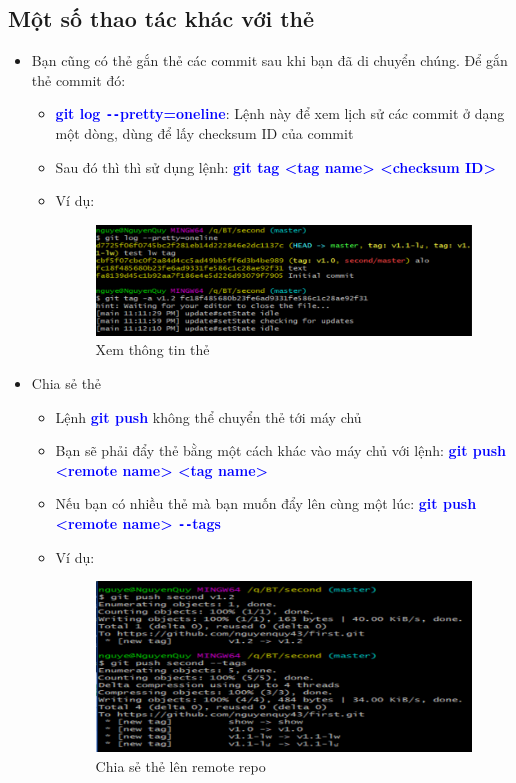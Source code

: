 \documentclass[12pt,a4paper]{report}
\begin{document}
\subsection{Một số thao tác khác với thẻ}
\begin{itemize}
\item Bạn cũng có thẻ gắn thẻ các commit sau khi bạn đã di chuyển chúng. Để gắn thẻ commit đó:
\begin{itemize}
\item \textcolor{blue}{\bf git log \texttt{-{}-}pretty=oneline}: Lệnh này để xem lịch sử các commit ở dạng một dòng, dùng để lấy checksum ID của commit
\item Sau đó thì thì sử dụng lệnh: \textcolor{blue}{\bf git tag <tag name> <checksum ID>}
\item Ví dụ: 

\begin{figure}[!ht]
	\centering
	\includegraphics[width=0.8\linewidth]{screenshot044}
\caption{Xem thông tin thẻ}
	\label{fig:screenshot044}
	\end{figure}
	
\end{itemize}
\item Chia sẻ thẻ
\begin{itemize}
\item Lệnh \textcolor{blue}{\bf git push} không thể chuyển thẻ tới máy chủ
\item Bạn sẽ phải đẩy thẻ bằng một cách khác vào máy chủ với lệnh: \textcolor{blue}{\bf git push <remote name> <tag name>}
\item Nếu bạn có nhiều thẻ mà bạn muốn đẩy lên cùng một lúc: \textcolor{blue}{\bf git push <remote name> \texttt{-{}-}tags}
\item Ví dụ:

\begin{figure}[!ht]
	\centering
	\includegraphics[width=0.8\linewidth]{screenshot045}
\caption{Chia sẻ thẻ lên remote repo}
	\label{fig:screenshot045}
	\end{figure}
	

\end{itemize}
\end{itemize}
\end{document}
